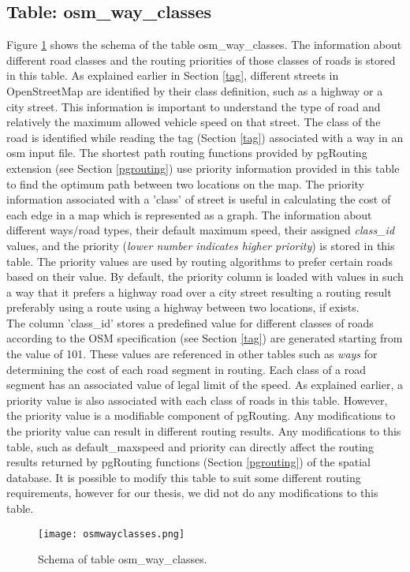 \subsection{Table: osm{\_}way{\_}classes}
Figure \ref{fg:osmwayclasses} shows the schema of the table osm{\_}way{\_}classes. The information about different road classes and the routing priorities of those classes of roads is stored in this table. As explained earlier in Section \ref{tag}, different streets in OpenStreetMap are identified by their class definition, such as a highway or a city street. This information is important to understand the type of road and relatively the maximum allowed vehicle speed on that street. The class of the road is identified while reading the tag (Section \ref{tag}) associated with a way in an osm input file. The shortest path routing functions provided by pgRouting extension (see Section \ref{pgrouting}) use priority information provided in this table to find the optimum path between two locations on the map. The priority information associated with a 'class' of street is useful in calculating the cost of each edge in a map which is represented as a graph. The information about different ways/road types, their default maximum speed, their assigned \textit{class{\_}id} values, and the priority (\textit{lower number indicates higher priority}) is stored in this table. The priority values are used by routing algorithms to prefer certain roads based on their value. By default, the priority column is loaded with values in such a way that it prefers a highway road over a city street resulting a routing result preferably using a route using a highway between two locations, if exists. \\

The column 'class{\_}id' stores a predefined value for different classes of roads according to the OSM specification (see Section \ref{tag}) are generated starting from the value of 101. These values are referenced in other tables such as \textit{ways} for determining the cost of each road segment in routing. Each class of a road segment has an associated value of legal limit of the speed. As explained earlier, a priority value is also associated with each class of roads in this table. However, the priority value is a modifiable component of pgRouting. Any modifications to the priority value can result in different routing results. Any modifications to this table, such as default{\_}maxspeed and priority can directly affect the routing results returned by pgRouting functions (Section \ref{pgrouting}) of the spatial database. It is possible to modify this table to suit some different routing requirements, however for our thesis, we did not do any modifications to this table.  
\begin{figure}
\centering
\texttt{[image: osmwayclasses.png]}
\caption{Schema of table osm{\_}way{\_}classes.}
\label{fg:osmwayclasses}
\end{figure}


